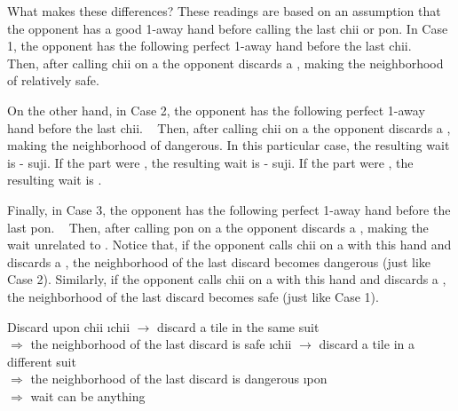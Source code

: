 {{\bigskip
What makes these differences? 
These readings are based on an assumption that the opponent has a good 1-away  hand before calling the last {\jap chii} or {\jap pon}. In Case 1, the opponent has the following perfect 1-away hand before the last {\jap chii}. 
\bp
{}
~\rfa\fa\fa
\ep {}
Then, after calling {\jap chii} on a {\large{}} the opponent discards a {\large{}}, making the neighborhood of {\large{}} relatively safe. 

\bigskip
On the other hand, in Case 2, the opponent has the following perfect 1-away hand before the last {\jap chii}. 
\bp
{}
~\rfa\fa\fa
\ep
Then, after calling {\jap chii} on a {\large{}} the opponent discards a {\large{}}, making the neighborhood of {\large{}} dangerous. In this particular case, the resulting wait is {\large{}-} {\jap suji}. If the {\large{}} part were {\large{}}, the resulting wait is {\large{}-} {\jap suji}.  If the {\large{}} part were {\large{}}, the resulting wait is {\large{}}. 

\bigskip
Finally, in Case 3, the opponent has the following perfect 1-away hand before the last {\jap pon}. 
\bp
{}
~\rfa\fa\fa
\ep
Then, after calling {\jap pon} on a {\large{}} the opponent discards a {\large{}}, making the wait unrelated to {\large{}}. Notice that, if the opponent calls {\jap chii} on a {\large{}} with this hand and discards a {\large{}}, the neighborhood of the last discard becomes dangerous (just like Case 2). Similarly, if the opponent calls {\jap chii} on a {\large{}} with this hand and discards a {\large{}}, the neighborhood of the last discard becomes safe (just like Case 1). 

\bigskip
\begin{itembox}[c]{Discard upon {\jap chii}}
\bi
\i {\jap chii} $\rightarrow$ discard a tile in the same suit \\
	$\Rightarrow$ the neighborhood of the last discard is {\large safe}
\i {\jap chii} $\rightarrow$ discard a tile in a different suit \\
	$\Rightarrow$ the neighborhood of the last discard is {\large dangerous}
\i {\jap pon} \\
	$\Rightarrow$ wait can be anything
\ei
\vsps
\end{itembox}

}}
